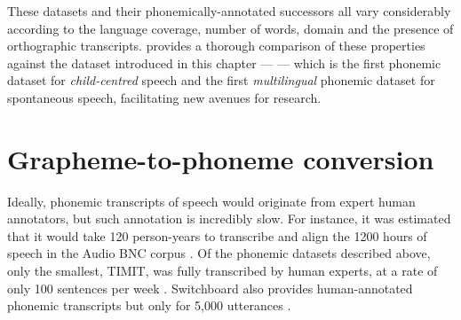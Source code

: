 \begin{sidewaystable}
\begin{threeparttable}
        \label{tab:13-dataset-properties}
    \end{threeparttable}
\end{sidewaystable}

These datasets and their phonemically-annotated successors all vary considerably according to the language coverage, number of words, domain and the presence of orthographic transcripts.  provides a thorough comparison of these properties against the dataset introduced in this chapter --- \ipachildes --- which is the first phonemic dataset for \emph{child-centred} speech and the first \emph{multilingual} phonemic dataset for spontaneous speech, facilitating new avenues for research. 

\section{Grapheme-to-phoneme conversion}\label{sec:13-g2p}



Ideally, phonemic transcripts of speech would originate from expert human annotators, but such annotation is incredibly slow. For instance, it was estimated that it would take 120 person-years to transcribe and align the 1200 hours of speech in the Audio BNC corpus \citep{coleman2011mining}. Of the phonemic datasets described above, only the smallest, TIMIT, was fully transcribed by human experts, at a rate of only 100 sentences per week \citep{zue1996transcription, lamel1989speech}. Switchboard also provides human-annotated phonemic transcripts but only for 5,000 utterances \citep{greenberg1996insights}.

